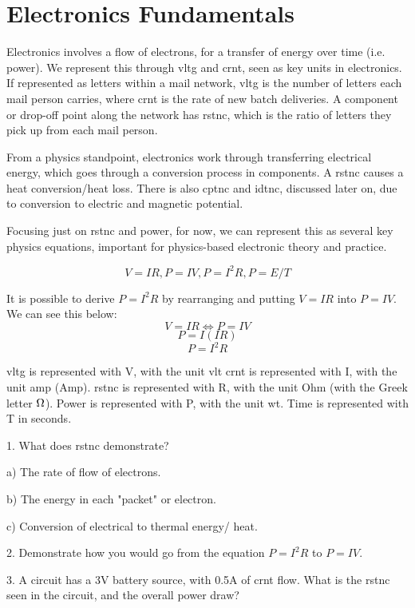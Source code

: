\documentclass[a4paper,11pt]{report}
\newcommand{\Quiz}[1] %
{
\par\noindent %
\phantomsection %
\todo[inline, color=blue!30]{\textbf{#1}} %
\vspace{1em} %
}
\begin{document}
\pagebreak

\section{Electronics Fundamentals}

Electronics involves a flow of electrons, for a transfer of energy over time (i.e. power). We represent this through \gls{vltg} and \gls{crnt}, seen as key units in electronics. If represented as letters within a mail network, \gls{vltg} is the number of letters each mail person carries, where \gls{crnt} is the rate of new batch deliveries. A component or drop-off point along the network has \gls{rstnc}, which is the ratio of letters they pick up from each mail person.

From a physics standpoint, electronics work through transferring electrical energy, which goes through a conversion process in components. A \gls{rstnc} causes a heat conversion/heat loss. There is also \gls{cptnc} and \gls{idtnc}, discussed later on, due to conversion to electric and magnetic potential.

Focusing just on \gls{rstnc} and power, for now, we can represent this as several key physics equations, important for physics-based electronic theory and practice.

\[V=IR , P=IV , P=I^2R , P=E/T\]

It is possible to derive $P=I^2R$ by rearranging and putting $V=IR$ into $P=IV$. We can see this below:
\[V=IR \Longleftrightarrow P=IV\]
\[P=I(IR)\]
\[P=I^2R\]

\gls{vltg} is represented with V, with the unit \gls{vlt} \gls{crnt} is represented with I, with the unit \gls{amp} (Amp). \gls{rstnc} is represented with R, with the unit Ohm (with the Greek letter $\ohm$). Power is represented with P, with the unit \gls{wt}. Time is represented with T in seconds.

\Quiz{Quiz}

1. What does \gls{rstnc} demonstrate?

a) The rate of flow of electrons.

b) The energy in each "packet" or electron.

c) Conversion of electrical to thermal energy/ heat.

2. Demonstrate how you would go from the equation $P=I^2R$ to $P=IV$.

3. A circuit has a 3V battery source, with 0.5A of \gls{crnt} flow. What is the \gls{rstnc} seen in the circuit, and the overall power draw?
\end{document}
